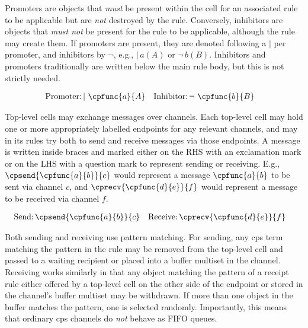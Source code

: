 Promoters are objects that \emph{must} be present within the cell for an associated rule to be applicable but are \emph{not} destroyed by the rule.  Conversely, inhibitors are objects that \emph{must not} be present for the rule to be applicable, although the rule may create them.  If promoters are present, they are denoted following a \(|\) per promoter, and inhibitors by \(\neg\), e.g., \(|\,a(A)\) or \(\neg\,b(B)\).  Inhibitors and promoters traditionally are written below the main rule body, but this is not strictly needed.

\begin{framed}
\vspace{-1.1cm}
\begin{align*}
    \text{Promoter:}&\, | ~ \cpfunc{a}{A} & \text{Inhibitor:}&\, \neg ~ \cpfunc{b}{B}
\end{align*}
\vspace{-0.8cm}
\end{framed}

Top-level cells may exchange messages over channels.  Each top-level cell may hold one or more appropriately labelled endpoints for any relevant channels, and may in its rules try both to send and receive messages via those endpoints.  A message is written inside braces and marked either on the RHS with an exclamation mark or on the LHS with a question mark to represent sending or receiving.  E.g., \(\cpsend{\cpfunc{a}{b}}{c}\) would represent a message \(\cpfunc{a}{b}\) to be sent via channel \(c\), and \(\cprecv{\cpfunc{d}{e}}{f}\) would represent a message to be received via channel \(f\).

\begin{framed}
\vspace{-1.1cm}
\begin{align*}
    \text{Send:}&\, \cpsend{\cpfunc{a}{b}}{c} & \text{Receive:}&\, \cprecv{\cpfunc{d}{e}}{f}
\end{align*}
\vspace{-0.8cm}
\end{framed}

Both sending and receiving use pattern matching.  For sending, any \gls{cps} term matching the pattern in the rule may be removed from the top-level cell and passed to a waiting recipient or placed into a buffer multiset in the channel.  Receiving works similarly in that any object matching the pattern of a receipt rule either offered by a top-level cell on the other side of the endpoint or stored in the channel's buffer multiset may be withdrawn.  If more than one object in the buffer matches the pattern, one is selected randomly.  Importantly, this means that ordinary \gls{cps} channels do \emph{not} behave as FIFO queues.

